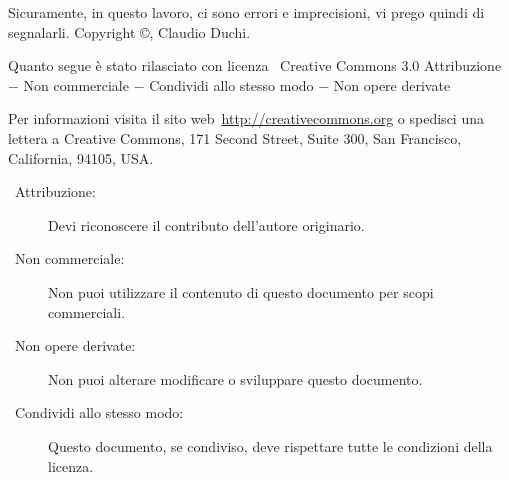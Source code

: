 Sicuramente, in questo lavoro, ci sono errori  e  imprecisioni, vi  prego quindi di  segnalarli.
\vfill
Copyright \copyright\@ \the\year, Claudio Duchi.

Quanto segue è stato rilasciato con licenza \ccLogo\ Creative Commons   3.0 Attribuzione $-$ Non commerciale $-$ Condividi allo stesso modo $-$ Non opere derivate

Per informazioni visita il sito web\ \url{http://creativecommons.org} o spedisci una lettera a Creative Commons, 171 Second Street, Suite 300, San Francisco, California, 94105, USA.

\begin{description}
\item[\ccAttribution\ Attribuzione:] Devi riconoscere il contributo dell'autore originario.
\item [\ccNonCommercial\ Non commerciale:] Non puoi utilizzare il contenuto di questo documento per scopi commerciali.
\item [\ccNoDerivatives\ Non opere derivate:]  Non puoi alterare modificare o sviluppare questo documento.
\item [\ccShareAlike\ Condividi allo stesso modo:]  Questo documento, se condiviso, deve rispettare tutte le condizioni della licenza.
\end{description}


